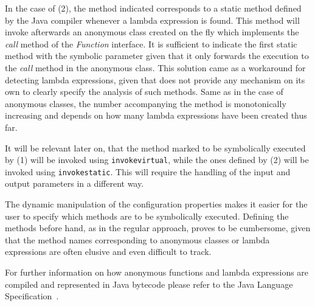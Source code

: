 In the case of (2), the method indicated corresponds to a static method defined by the Java compiler whenever a lambda expression is found. This method will invoke afterwards an anonymous class created on the fly which implements the \textit{call} method of the \textit{Function} interface. It is sufficient to indicate the first static method with the symbolic parameter given that it only forwards the execution to the \textit{call} method in the anonymous class. This solution came as a workaround for detecting lambda expressions, given that \spf{} does not provide any mechanism on its own to clearly specify the analysis of such methods. Same as in the case of anonymous classes, the number accompanying the method is monotonically increasing and depends on how many lambda expressions have been created thus far.

It will be relevant later on, that the method marked to be symbolically executed by (1) will be invoked using \texttt{invokevirtual}, while the ones defined by (2) will be invoked using \texttt{invokestatic}. This will require the handling of the input and output parameters in a different way.

The dynamic manipulation of the configuration properties makes it easier for the user to specify which methods are to be symbolically executed. Defining the methods before hand, as in the regular \spf{} approach, proves to be cumbersome, given that the method names corresponding to anonymous classes or lambda expressions are often elusive and even difficult to track.

For further information on how anonymous functions and lambda expressions are compiled and represented in Java bytecode please refer to the Java Language Specification~\cite{Gosling2014}.


